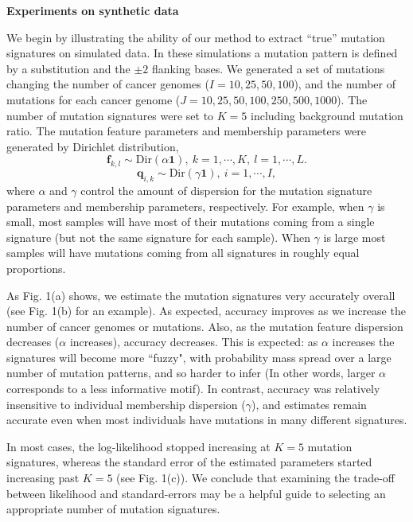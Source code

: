 \documentclass{article}
\begin{document}

\vspace*{1.0cm}
{\LARGE \bf Experiments on synthetic data}
\vspace*{0.25cm}


We begin by illustrating the ability of our method to extract ``true'' mutation signatures on simulated data. In these simulations a mutation pattern
is defined by a substitution and the $\pm 2$ flanking bases.
We generated a set of mutations changing the number of cancer genomes ($I=10, 25, 50, 100$),  and the number of mutations for each cancer genome ($J=10, 25, 50, 100, 250, 500, 1000$).
The number of mutation signatures were set to $K=5$ including background mutation ratio.
The mutation feature parameters and membership parameters were generated by Dirichlet distribution,
\begin{equation}
\bm{f}_{k,l} \sim \text{Dir} (\alpha \bm{1} ),\ k = 1, \cdots, K,\  l = 1, \cdots, L.
\end{equation}
 \begin{equation}
 \bm{q}_{i, k} \sim \text{Dir} (\gamma \bm{1} ),\ i = 1, \cdots, I,
 \end{equation}
where $\alpha$ and $\gamma$ control the amount of dispersion 
for the mutation signature parameters and membership parameters, respectively.
For example, when $\gamma$ is small, most samples will have most of their
mutations coming from a single signature (but not the same signature for each sample). When $\gamma$ is large most samples will have mutations coming from all signatures in roughly equal proportions.

As Fig. 1(a) shows, we estimate the mutation signatures very accurately overall (see Fig. 1(b) for an example).
As expected, accuracy improves as we increase the number of cancer genomes or mutations.
Also, as the mutation feature dispersion decreases ($\alpha$ increases), accuracy decreases.
This is expected: as $\alpha$ increases the signatures will become more ``fuzzy", with
probability mass spread over a large number of mutation patterns, and so harder to infer
(In other words, larger $\alpha$ corresponds to a less informative motif).
In contrast, accuracy was relatively insensitive to 
individual membership dispersion ($\gamma$), and estimates remain accurate even when most individuals have mutations in many different signatures.

In most cases, the log-likelihood stopped increasing at $K=5$ mutation signatures, 
whereas the standard error of the estimated parameters started increasing past $K=5$ (see Fig. 1(c)). We conclude that examining
the trade-off between likelihood and standard-errors may be a helpful guide to selecting an appropriate number of mutation signatures.
\end{document}
